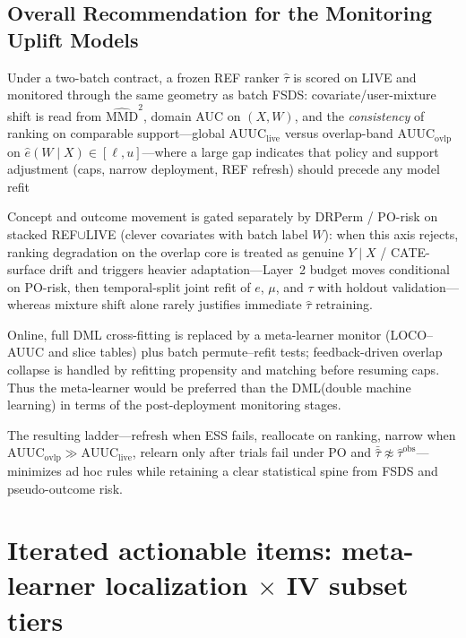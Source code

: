 \documentclass{article}
\begin{document}
\subsection{Overall Recommendation for the Monitoring Uplift Models}
\par Under a two-batch contract, a frozen REF ranker $\hat\tau$ is scored on LIVE and monitored through the same geometry as batch FSDS: covariate/user-mixture shift is read from $\widehat{\mathrm{MMD}}^2$, domain AUC on $(X,W)$, and the \emph{consistency} of ranking on comparable support---global $\mathrm{AUUC}_{\mathrm{live}}$ versus overlap-band $\mathrm{AUUC}_{\mathrm{ovlp}}$ on $\hat e(W\mid X)\in[\ell,u]$---where a large gap indicates that policy and support adjustment (caps, narrow deployment, REF refresh) should precede any model refit\\
\par Concept and outcome movement is gated separately by DRPerm / PO-risk on stacked REF$\cup$LIVE (clever covariates with batch label $W$): when this axis rejects, ranking degradation on the overlap core is treated as genuine $Y\mid X$ / CATE-surface drift and triggers heavier adaptation---Layer~2 budget moves conditional on PO-risk, then temporal-split joint refit of $e$, $\mu$, and $\tau$ with holdout validation---whereas mixture shift alone rarely justifies immediate $\hat\tau$ retraining.\\
\par Online, full DML cross-fitting is replaced by a meta-learner monitor (LOCO--AUUC and slice tables) plus batch permute--refit tests; feedback-driven overlap collapse is handled by refitting propensity and matching before resuming caps. Thus the meta-learner would be preferred than the DML(double machine learning) in terms of the post-deployment monitoring stages.\\
\par The resulting ladder---refresh when ESS fails, reallocate on ranking, narrow when $\mathrm{AUUC}_{\mathrm{ovlp}}\gg \mathrm{AUUC}_{\mathrm{live}}$, relearn only after trials fail under PO and $\bar{\hat\tau}\not\approx\widehat{\tau}^{\mathrm{obs}}$---minimizes ad hoc rules while retaining a clear statistical spine from FSDS and pseudo-outcome risk.\\

\section{Iterated actionable items: meta-learner localization $\times$ IV subset tiers}
\label{sec:actionables-meta-iv}
\end{document}
